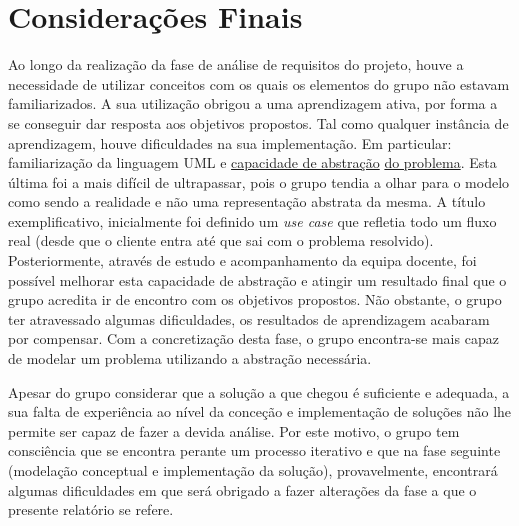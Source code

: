 \documentclass[a4paper,12pt]{scrreprt}
\begin{document}
\chapter{Considerações Finais}
Ao longo da realização da fase de análise de requisitos do projeto, houve a necessidade de utilizar conceitos
com os quais os elementos do grupo não estavam familiarizados.
A sua utilização obrigou a uma aprendizagem ativa, por forma a se conseguir dar resposta aos objetivos propostos.
Tal como qualquer instância de aprendizagem, houve dificuldades na sua implementação.
Em particular: familiarização da linguagem UML e \underline{capacidade de abstração} \underline{do problema}.
Esta última foi a mais difícil de ultrapassar, pois o grupo tendia a olhar para o modelo como sendo a realidade
e não uma representação abstrata da mesma.
A título exemplificativo, inicialmente foi definido um \textit{use case} que refletia todo um fluxo real
(desde que o cliente entra até que sai com o problema resolvido).
Posteriormente, através de estudo e acompanhamento da equipa docente, foi possível melhorar esta capacidade de abstração
e atingir um resultado final que o grupo acredita ir de encontro com os objetivos propostos.
Não obstante, o grupo ter atravessado algumas dificuldades, os resultados de aprendizagem acabaram por compensar.
Com a concretização desta fase, o grupo encontra-se mais capaz de modelar um problema utilizando a abstração necessária.

Apesar do grupo considerar que a solução a que chegou é suficiente e adequada, a sua falta de experiência
ao nível da conceção e implementação de soluções não lhe permite ser capaz de fazer a devida análise.
Por este motivo, o grupo tem consciência que se encontra perante um processo iterativo e que
na fase seguinte (modelação conceptual e implementação da solução), provavelmente, encontrará algumas dificuldades
em que será obrigado a fazer alterações da fase a que o presente relatório se refere.



\renewcommand{\nomname}{Lista de Siglas e Acrónimos}

\renewcommand{\nompreamble}{}

\end{document}
